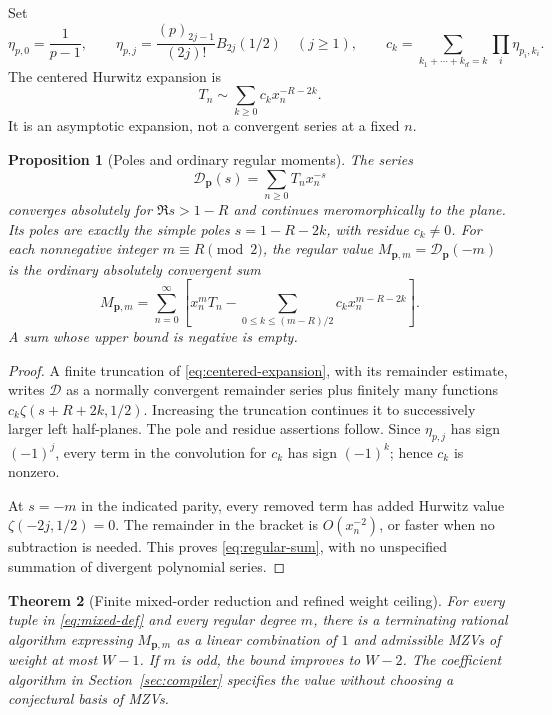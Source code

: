 \documentclass[11pt,letterpaper]{article}
\numberwithin{equation}{section}
\newtheorem{theorem}{Theorem}[section]
\newtheorem{proposition}[theorem]{Proposition}
\theoremstyle{definition}\newtheorem{definition}[theorem]{Definition}
\theoremstyle{remark}\newtheorem{remark}[theorem]{Remark}
\begin{document}
Set
\begin{equation}\label{eq:etas}
 \eta_{p,0}=\frac1{p-1},\qquad
 \eta_{p,j}=\frac{(p)_{2j-1}}{(2j)!}B_{2j}(1/2)\quad(j\ge1),
 \qquad
 c_k=\sum_{k_1+\cdots+k_d=k}\prod_i\eta_{p_i,k_i}.
\end{equation}
The centered Hurwitz expansion \cite{DLMF} is
\begin{equation}\label{eq:centered-expansion}
 T_n\sim\sum_{k\ge0}c_kx_n^{-R-2k}.
\end{equation}
It is an asymptotic expansion, not a convergent series at a fixed $n$.

\begin{proposition}[Poles and ordinary regular moments]\label{prop:regular}
The series
\[
 \mathcal D_{\boldsymbol p}(s)=\sum_{n\ge0}T_nx_n^{-s}
\]
converges absolutely for $\Re s>1-R$ and continues meromorphically
to the plane. Its poles are exactly the simple poles
$s=1-R-2k$, with residue $c_k\ne0$.
For each nonnegative integer $m\equiv R\pmod2$, the regular value
$M_{\boldsymbol p,m}=\mathcal D_{\boldsymbol p}(-m)$ is the ordinary
absolutely convergent sum
\begin{equation}\label{eq:regular-sum}
 \boxed{M_{\boldsymbol p,m}=
 \sum_{n=0}^{\infty}\left[
 x_n^mT_n-
 \sum_{0\le k\le(m-R)/2}c_kx_n^{m-R-2k}\right].}
\end{equation}
A sum whose upper bound is negative is empty.
\end{proposition}

\begin{proof}
A finite truncation of \eqref{eq:centered-expansion}, with its
remainder estimate, writes $\mathcal D$ as a normally convergent
remainder series plus finitely many functions
$c_k\zeta(s+R+2k,1/2)$. Increasing the truncation continues it to
successively larger left half-planes. The pole and residue assertions
follow. Since $\eta_{p,j}$ has sign $(-1)^j$, every term in the
convolution for $c_k$ has sign $(-1)^k$; hence $c_k$ is nonzero.

At $s=-m$ in the indicated parity, every removed term has added
Hurwitz value $\zeta(-2j,1/2)=0$. The remainder in the bracket
is $O(x_n^{-2})$, or faster when no subtraction is needed. This
proves \eqref{eq:regular-sum}, with no unspecified summation of
divergent polynomial series.
\end{proof}

\begin{theorem}[Finite mixed-order reduction and refined weight ceiling]
\label{thm:compiler}
For every tuple in \eqref{eq:mixed-def} and every regular degree $m$,
there is a terminating rational algorithm expressing
$M_{\boldsymbol p,m}$ as a linear combination of $1$ and admissible
MZVs of weight at most $W-1$. If $m$ is odd, the bound improves to
$W-2$. The coefficient algorithm in Section~\ref{sec:compiler}
specifies the value without choosing a conjectural basis of MZVs.
\end{theorem}
\end{document}
